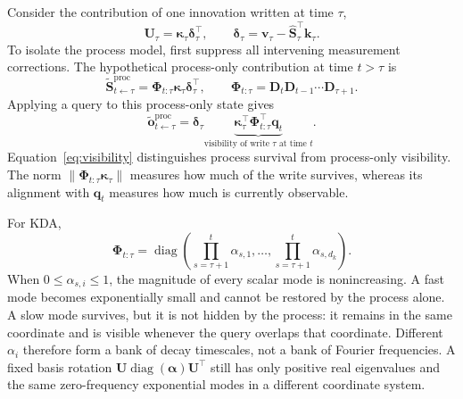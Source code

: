 \documentclass[11pt]{article}
\newcommand{\ve}[1]{\boldsymbol{#1}}
\newcommand{\tr}{\intercal}
\DeclareMathOperator{\diag}{diag}
\begin{document}
Consider the contribution of one innovation written at time $\tau$,
\begin{equation}
  \ve{U}_\tau=\ve{\kappa}_\tau\ve{\delta}_\tau^{\tr},
  \qquad
  \ve{\delta}_\tau
  =\ve{v}_\tau-\widehat{\ve{S}}_\tau^{\tr}\ve{k}_\tau.
\end{equation}
To isolate the process model, first suppress all intervening measurement corrections. The
hypothetical process-only contribution at time $t>\tau$ is
\begin{equation}
  \widetilde{\ve{S}}^{\mathrm{proc}}_{t\leftarrow\tau}
  =\ve{\Phi}_{t:\tau}\ve{\kappa}_\tau\ve{\delta}_\tau^{\tr},
  \qquad
  \ve{\Phi}_{t:\tau}
  =\ve{D}_t\ve{D}_{t-1}\cdots\ve{D}_{\tau+1}.
  \label{eq:process-contribution}
\end{equation}
Applying a query to this process-only state gives
\begin{equation}
  \widetilde{\ve{o}}^{\mathrm{proc}}_{t\leftarrow\tau}
  =\ve{\delta}_\tau
   \underbrace{\ve{\kappa}_\tau^{\tr}
   \ve{\Phi}_{t:\tau}^{\tr}\ve{q}_t}_{\text{visibility of write $\tau$ at time $t$}}.
  \label{eq:visibility}
\end{equation}
Equation~\eqref{eq:visibility} distinguishes process survival from process-only visibility. The norm
$\|\ve{\Phi}_{t:\tau}\ve{\kappa}_\tau\|$ measures how much of the write survives, whereas
its alignment with $\ve{q}_t$ measures how much is currently observable.

For KDA,
\begin{equation}
  \ve{\Phi}_{t:\tau}
  =\diag\!\left(
    \prod_{s=\tau+1}^{t}\alpha_{s,1},\ldots,
    \prod_{s=\tau+1}^{t}\alpha_{s,d_k}
  \right).
  \label{eq:diagonal-product}
\end{equation}
When $0\leq\alpha_{s,i}\leq1$, the magnitude of every scalar mode is nonincreasing.
A fast mode becomes exponentially small and cannot be restored by the process alone. A slow
mode survives, but it is not hidden by the process: it remains in the same coordinate and is
visible whenever the query overlaps that coordinate. Different $\alpha_i$ therefore form a
bank of decay timescales, not a bank of Fourier frequencies. A fixed basis rotation
$\ve{U}\diag(\ve{\alpha})\ve{U}^{\tr}$ still has only positive real eigenvalues and the same
zero-frequency exponential modes in a different coordinate system.
\end{document}
